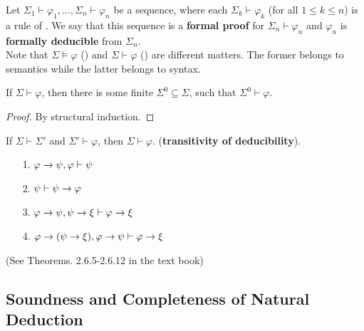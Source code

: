 \documentclass[english, 11pt]{article}
\begin{document}
    \begin{defn}\label{formal proof}
      Let $\Sigma_1 \vdash \varphi_1, \ldots, \Sigma_n \vdash \varphi_n$ be a sequence, where each $\Sigma_k \vdash \varphi_k$ (for all $1 \leq k \leq n$) is a rule of . We say that this sequence is a \textbf{formal proof} for $\Sigma_n \vdash \varphi_n$ and $\varphi_n$ is \textbf{formally deducible} from $\Sigma_n$. \\

      Note that $\Sigma \models \varphi$ () and $\Sigma \vdash \varphi$ () are different matters. The former belongs to semantics while the latter belongs to syntax.
    \end{defn}

    \begin{thrm}
      If $\Sigma \vdash \varphi$, then there is some finite $\Sigma^0 \subseteq \Sigma$, such that $\Sigma^0 \vdash \varphi$.
    \end{thrm}

    \begin{proof} By structural induction.

    \end{proof}

    \begin{thrm}\label{transitivity of deducibility}
      If $\Sigma \vdash \Sigma'$ and $\Sigma' \vdash \varphi$, then $\Sigma \vdash \varphi$. (\textbf{transitivity of deducibility}).
    \end{thrm}

    \begin{thrm}
      \begin{itemize}
        \item[1.] $\varphi \rightarrow \psi, \varphi \vdash \psi$
        \item[2.] $\psi \vdash \psi \rightarrow \varphi$
        \item[3.] $\varphi \rightarrow \psi, \psi \rightarrow \xi \vdash \varphi \rightarrow \xi$
        \item[4.] $\varphi \rightarrow (\psi \rightarrow \xi), \varphi \rightarrow \psi \vdash \varphi \rightarrow \xi$
      \end{itemize}
      (See Theorems. 2.6.5-2.6.12 in the text book)
    \end{thrm}

    \subsection[Soundness and Completeness]{Soundness and Completeness of Natural Deduction}
\end{document}
